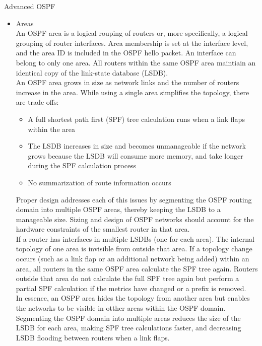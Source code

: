 \documentclass{article}
\begin{document}
Advanced OSPF
\begin{itemize}
	\item Areas\\
		An OSPF area is a logical rouping of routers or, more specifically, a logical grouping of router interfaces. Area membership is set at the interface level, and the area ID is included in the OSPF hello packet. An interface can belong to only one area. All routers within the same OSPF area maintiain an identical copy of the link-state database (LSDB).\\

		An OSPF area grows in size as network links and the number of routers increase in the area. While using a single area simplifies the topology, there are trade offs:
		\begin{itemize}
			\item A full shortest path first (SPF) tree calculation runs when a link flaps within the area
			\item The LSDB increases in size and becomes unmanageable if the network grows because the LSDB will consume more memory, and take longer during the SPF calculation process
			\item No summarization of route information occurs
		\end{itemize}
		Proper design addresses each of this issues by segmenting the OSPF routing domain into multiple OSPF areas, thereby keeping the LSDB to a manageable size. Sizing and design of OSPF networks should account for the hardware constraints of the smallest router in that area.\\

		If a router has interfaces in multiple LSDBs (one for each area). The internal topology of one area is invisible from outside that area. If a topology change occurs (such as a link flap or an additional network being added) within an area, all routers in the same OSPF area calculate the SPF tree again. Routers outside that area do not calculate the full SPF tree again but perform a partial SPF calculation if the metrics have changed or a prefix is removed.\\

		In essence, an OSPF area hides the topology from another area but enables the networks to be visible in otther areas within the OSPF domain. Segmenting the OSPF domain into multiple areas reduces the size of the LSDB for each area, making SPF tree calculations faster, and decreasing LSDB flooding between routers when a link flaps.\\


\end{itemize}
\end{document}
